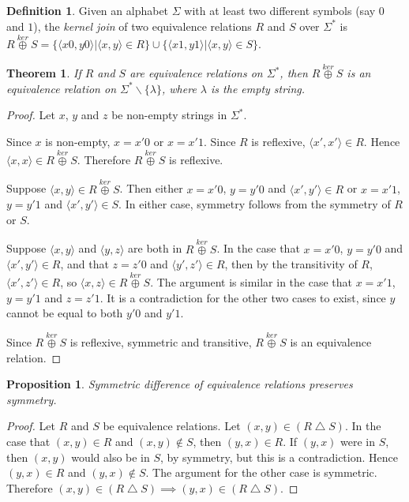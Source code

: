 \documentclass{article}
\newtheorem{theorem}{Theorem}[section]
\newtheorem{proposition}[proposition]{Proposition}
\theoremstyle{definition} \newtheorem{definition}[definition]{Definition}
\newcommand{\kj}{\overset{ker}{\oplus}} %
\newcommand{\symdiff}{\bigtriangleup} %
\newcommand{\defn}[1]{\emph{#1}} %
\newcommand{\pair}[2]{\langle#1,#2\rangle} %
\begin{document}
\begin{definition}
  Given an alphabet $\Sigma$ with at least two different symbols (say $0$ and
  $1$), the \defn{kernel join} of two equivalence relations $R$ and $S$ over
  $\Sigma^*$ is $R\kj S=\{\pair{x0}{y0}|\pair{x}{y}\in
  R\}\cup\{\pair{x1}{y1}|\pair{x}{y}\in S\}$.
\end{definition}

\begin{theorem}
  If $R$ and $S$ are equivalence relations on $\Sigma^*$, then $R\kj S$ is an
  equivalence relation on $\Sigma^*\backslash\{\lambda\}$, where $\lambda$ is
  the empty string.
\end{theorem}
\begin{proof}
  Let $x$, $y$ and $z$ be non-empty strings in $\Sigma^*$.
  
  Since $x$ is non-empty, $x=x'0$ or $x=x'1$. Since $R$ is reflexive,
  $\pair{x'}{x'}\in R$. Hence $\pair{x}{x}\in R\kj S$. Therefore $R\kj S$ is
  reflexive.
  
  Suppose $\pair{x}{y}\in R\kj S$. Then either $x=x'0$, $y=y'0$ and
  $\pair{x'}{y'}\in R$ or $x=x'1$, $y=y'1$ and $\pair{x'}{y'}\in S$. In either
  case, symmetry follows from the symmetry of $R$ or $S$.

  Suppose $\pair{x}{y}$ and $\pair{y}{z}$ are both in $R\kj S$. In the case
  that $x=x'0$, $y=y'0$ and $\pair{x'}{y'}\in R$, and that $z=z'0$ and
  $\pair{y'}{z'}\in R$, then by the transitivity of $R$, $\pair{x'}{z'}\in R$,
  so $\pair{x}{z}\in R\kj S$. The argument is similar in the case that $x=x'1$,
  $y=y'1$ and $z=z'1$. It is a contradiction for the other two cases to exist,
  since $y$ cannot be equal to both $y'0$ and $y'1$.

  Since $R\kj S$ is reflexive, symmetric and transitive, $R\kj S$ is an
  equivalence relation.
\end{proof}

\begin{proposition}\label{prop:symdiff}
  Symmetric difference of equivalence relations preserves symmetry.
\end{proposition}
\begin{proof}
  Let $R$ and $S$ be equivalence relations. Let $(x,y)\in(R\symdiff S)$. In
  the case that $(x,y)\in R$ and $(x,y)\notin S$, then $(y,x)\in R$. If $(y,x)$
  were in $S$, then $(x,y)$ would also be in $S$, by symmetry, but this is a
  contradiction. Hence $(y,x)\in R$ and $(y,x)\notin S$. The argument for the
  other case is symmetric. Therefore $(x,y)\in(R\symdiff S)\implies
  (y,x)\in(R\symdiff S)$.
\end{proof}
\end{document}
